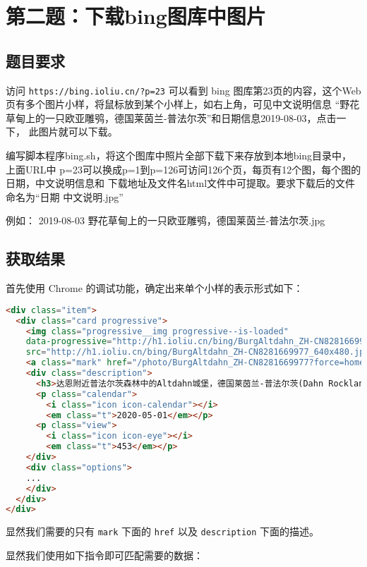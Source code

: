 \documentclass[blue,normal,cn]{elegantnote}
\newcommand{\code}[1]{\colorbox{light-gray}{\texttt{#1}}}
\begin{document}
\section{第二题：下载bing图库中图片}

\subsection{题目要求}

访问 \code{https://bing.ioliu.cn/?p=23} 可以看到 bing 图库第23页的内容，这个Web页有多个图片小样，将鼠标放到某个小样上，如右上角，可见中文说明信息 “野花草甸上的一只欧亚雕鸮，德国莱茵兰-普法尔茨”和日期信息2019-08-03，点击一下，
此图片就可以下载。

编写脚本程序bing.sh，将这个图库中照片全部下载下来存放到本地bing目录中，上面URL中
p=23可以换成p=1到p=126可访问126个页，每页有12个图，每个图的日期，中文说明信息和
下载地址及文件名html文件中可提取。要求下载后的文件命名为“日期 中文说明.jpg”

例如：
2019-08-03 野花草甸上的一只欧亚雕鸮，德国莱茵兰-普法尔茨.jpg

\subsection{获取结果}
首先使用 Chrome 的调试功能，确定出来单个小样的表示形式如下：

\begin{lstlisting}[language=HTML]
<div class="item">
  <div class="card progressive">
	<img class="progressive__img progressive--is-loaded" 
	data-progressive="http://h1.ioliu.cn/bing/BurgAltdahn_ZH-CN8281669977_640x480.jpg?imageslim" 
	src="http://h1.ioliu.cn/bing/BurgAltdahn_ZH-CN8281669977_640x480.jpg?imageslim">
    <a class="mark" href="/photo/BurgAltdahn_ZH-CN8281669977?force=home_1"></a>
    <div class="description">
      <h3>达恩附近普法尔茨森林中的Altdahn城堡，德国莱茵兰-普法尔茨(Dahn Rockland), Palatinate Forest, Rhineland-Palatinate, Germany (© Reinhard Schmid/Huber/eStock Photo)</h3>
      <p class="calendar">
        <i class="icon icon-calendar"></i>
        <em class="t">2020-05-01</em></p>
      <p class="view">
        <i class="icon icon-eye"></i>
        <em class="t">453</em></p>
    </div>
	<div class="options">
	... 
    </div>
  </div>
</div>
\end{lstlisting}

显然我们需要的只有 \code{mark} 下面的 \code{href} 以及 \code{description} 下面的描述。

显然我们使用如下指令即可匹配需要的数据：
\end{document}
